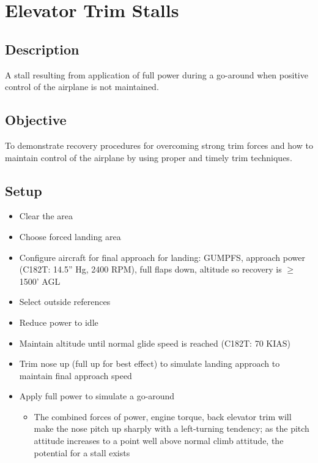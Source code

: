 \section{Elevator Trim Stalls}

\subsection{Description}

A stall resulting from application of full power during a go-around when
positive control of the airplane is not maintained.

\subsection{Objective}

To demonstrate recovery procedures for overcoming strong trim forces and how to
maintain control of the airplane by using proper and timely trim techniques.

\subsection{Setup}

\begin{itemize}
  \item Clear the area
  \item Choose forced landing area
  \item Configure aircraft for final approach for landing: GUMPFS, approach
    power (C182T: 14.5'' Hg, 2400 RPM), full flaps down, altitude so recovery
    is $\geq$ 1500' AGL
  \item Select outside references
  \item Reduce power to idle
  \item Maintain altitude until normal glide speed is reached (C182T: 70 KIAS)
  \item Trim nose up (full up for best effect) to simulate landing approach to
    maintain final approach speed
  \item Apply full power to simulate a go-around
    \begin{itemize}
      \item The combined forces of power, engine torque, back elevator trim
        will make the nose pitch up sharply with a left-turning tendency; as
        the pitch attitude increases to a point well above normal climb
        attitude, the potential for a stall exists
    \end{itemize}
\end{itemize}

